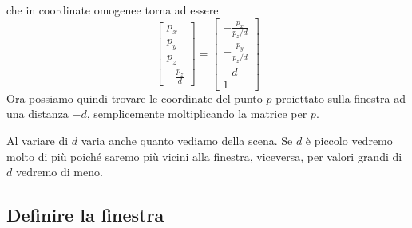 che in coordinate omogenee torna ad essere
\[
	\begin{bmatrix}
		p_x \\ p_y \\ p_z \\ -\frac{p_z}{d}
	\end{bmatrix} =
	\begin{bmatrix}
		-\frac{p_x}{p_z / d} \\
		-\frac{p_y}{p_z / d} \\
		-d                   \\
		1
	\end{bmatrix}
\]
Ora possiamo quindi trovare le coordinate del punto $p$ proiettato sulla finestra ad una distanza $-d$, semplicemente
moltiplicando la matrice per $p$.

Al variare di $d$ varia anche quanto vediamo della scena. Se $d$ \`e piccolo vedremo molto di pi\`u poich\'e saremo
pi\`u vicini alla finestra, viceversa, per valori grandi di $d$ vedremo di meno.

\subsection{Definire la finestra}